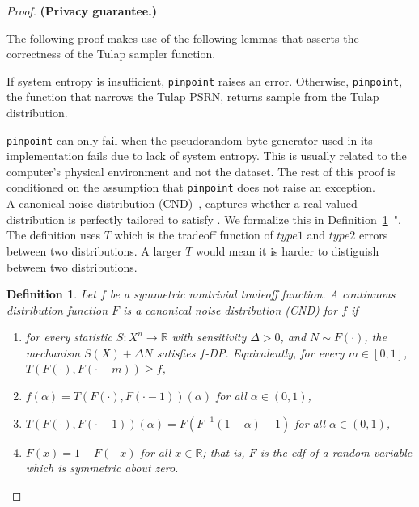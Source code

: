 \documentclass{article}
\newtheorem{defn}{Definition}
\begin{document}
\begin{proof} 
\textbf{(Privacy guarantee.)} 

\begin{tcolorbox}
    \begin{note}
    The following proof makes use of the following lemmas that asserts the correctness of the Tulap sampler function.
    \begin{lemma}
        If system entropy is insufficient, \texttt{pinpoint} raises an error. 
        Otherwise, \texttt{pinpoint}, the function that narrows the Tulap PSRN, 
        returns sample from the Tulap distribution.
    \end{lemma}
    \end{note}
\end{tcolorbox}

\texttt{pinpoint} can only fail when the pseudorandom byte generator used in its implementation fails due to lack of system entropy. 
This is usually related to the computer's physical environment and not the dataset. 
The rest of this proof is conditioned on the assumption that \texttt{pinpoint} does not raise an exception. \\

A canonical noise distribution (CND)~\parencite{awan2023canonical}, 
captures whether a real-valued distribution is perfectly tailored to satisfy . 
We formalize this in Definition~\ref{def2}~\parencite{awan2023canonical}". The definition uses $T$ which is the tradeoff function of $type 1$ and $type 2$ errors between two distributions. A larger $T$ would mean it is harder to distiguish between two distributions.  
\begin{defn}\label{def2}  %
Let $f$ be a symmetric nontrivial tradeoff function. A {continuous} distribution function $F$ is a \emph{canonical noise distribution} (CND) for $f$ if 
\begin{enumerate}[(1)]
    \item for every statistic $S: X^n\rightarrow \mathbb{R}$ with sensitivity $\Delta>0$, and $N\sim F(\cdot)$, 
        the mechanism $S(X) + \Delta N$ satisfies $f$-DP. Equivalently, for every $m\in [0,1]$, $T(F(\cdot),F(\cdot-m))\geq f$,
    \item $f(\alpha)=T(F(\cdot),F(\cdot-1))(\alpha)$ for all $\alpha \in (0,1)$,
    \item $T(F(\cdot),F(\cdot-1))(\alpha) = F(F^{-1}(1-\alpha)-1)$ for all $\alpha \in (0,1)$,
    \item $F(x) = 1-F(-x)$ for all $x\in \mathbb{R}$; that is, $F$ is the cdf of a random variable which is symmetric about zero.
\end{enumerate}
\end{defn}


\end{proof}
\end{document}
